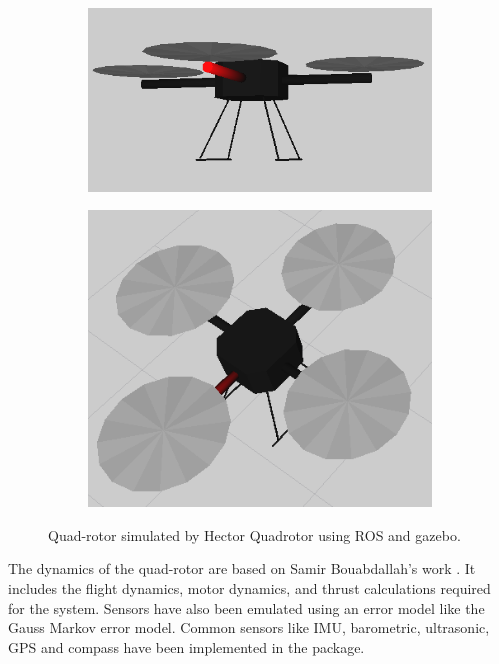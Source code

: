 \documentclass[hidelinks,BTech]{iitmdiss}
\begin{document}
\begin{figure}[H]
  \centering
    \begin{subfigure}[c]{0.45\textwidth}
      \centering
        \includegraphics[width=\textwidth]{quadrotor_sim.png}
    \end{subfigure}
    \begin{subfigure}[c]{0.45\textwidth}
      \centering
        \includegraphics[width=\textwidth]{quadrotor_sim2.png}
    \end{subfigure}
    \caption{Quad-rotor simulated by Hector Quadrotor using ROS and gazebo.}
\end{figure}

The dynamics of the quad-rotor are based on Samir Bouabdallah's work \cite{QuadrotorDynamics}. It includes the flight dynamics, motor dynamics, and thrust calculations required for the system. Sensors have also been emulated using an error model like the Gauss Markov error model. Common sensors like IMU, barometric, ultrasonic, GPS and compass have been implemented in the package.
\end{document}

